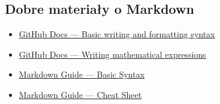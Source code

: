 \documentclass[11pt, a4paper]{article}
\begin{document}
\subsection{Dobre materiały o Markdown}
\begin{itemize}
    \item \href{https://docs.github.com/en/get-started/writing-on-github/getting-started-with-writing-and-formatting-on-github/basic-writing-and-formatting-syntax}{GitHub Docs — Basic writing and formatting syntax}
    \item \href{https://docs.github.com/en/get-started/writing-on-github/working-with-advanced-formatting/writing-mathematical-expressions}{GitHub Docs — Writing mathematical expressions}
    \item \href{https://www.markdownguide.org/basic-syntax/}{Markdown Guide — Basic Syntax}
    \item \href{https://www.markdownguide.org/cheat-sheet/}{Markdown Guide — Cheat Sheet}
\end{itemize}
\end{document}
